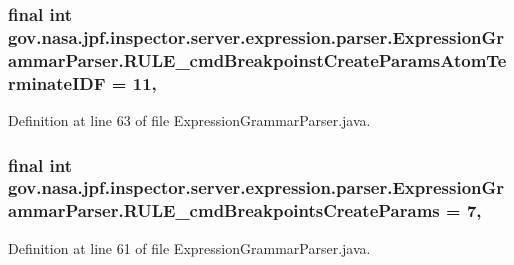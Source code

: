 \subsubsection[{\texorpdfstring{R\+U\+L\+E\+\_\+cmd\+Breakpoinst\+Create\+Params\+Atom\+Terminate\+I\+DF}{RULE_cmdBreakpoinstCreateParamsAtomTerminateIDF}}]{\setlength{\rightskip}{0pt plus 5cm}final int gov.\+nasa.\+jpf.\+inspector.\+server.\+expression.\+parser.\+Expression\+Grammar\+Parser.\+R\+U\+L\+E\+\_\+cmd\+Breakpoinst\+Create\+Params\+Atom\+Terminate\+I\+DF = 11\hspace{0.3cm}{\ttfamily [static]}, {\ttfamily [package]}}\hypertarget{classgov_1_1nasa_1_1jpf_1_1inspector_1_1server_1_1expression_1_1parser_1_1_expression_grammar_parser_aa362e794e1e6f828f242ad134cb08a18}{}\label{classgov_1_1nasa_1_1jpf_1_1inspector_1_1server_1_1expression_1_1parser_1_1_expression_grammar_parser_aa362e794e1e6f828f242ad134cb08a18}


Definition at line 63 of file Expression\+Grammar\+Parser.\+java.

\subsubsection[{\texorpdfstring{R\+U\+L\+E\+\_\+cmd\+Breakpoints\+Create\+Params}{RULE_cmdBreakpointsCreateParams}}]{\setlength{\rightskip}{0pt plus 5cm}final int gov.\+nasa.\+jpf.\+inspector.\+server.\+expression.\+parser.\+Expression\+Grammar\+Parser.\+R\+U\+L\+E\+\_\+cmd\+Breakpoints\+Create\+Params = 7\hspace{0.3cm}{\ttfamily [static]}, {\ttfamily [package]}}\hypertarget{classgov_1_1nasa_1_1jpf_1_1inspector_1_1server_1_1expression_1_1parser_1_1_expression_grammar_parser_a0303cdd38ece8fc7222bda462c0be691}{}\label{classgov_1_1nasa_1_1jpf_1_1inspector_1_1server_1_1expression_1_1parser_1_1_expression_grammar_parser_a0303cdd38ece8fc7222bda462c0be691}


Definition at line 61 of file Expression\+Grammar\+Parser.\+java.

